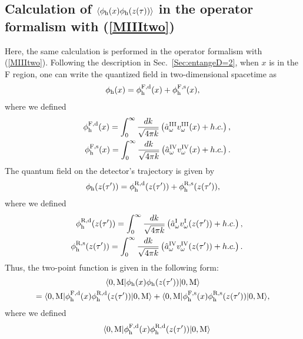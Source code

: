 \documentclass[aps,prd,preprintnumbers,nofootinbib,showpacs,11pt]{revtex4}%
\begin{document}
\begin{widetext}
\subsection{Calculation of $\langle\phi_{\rm h}(x)\phi_{\rm h}(z(\tau))\rangle$ in the operator formalism with 
(\ref{MIIItwo})}
Here, the same calculation is performed in the operator formalism with (\ref{MIIItwo}).
Following the description in Sec.~\ref{Sec:entangeD=2}, 
when $x$ is in the F region, one can write the quantized field 
in two-dimensional spacetime as 
\begin{eqnarray}
\phi_{\rm h}(x)=\phi_{\rm h}^{\rm F,d}(x)+\phi_{\rm h}^{\rm F,s}(x),
\end{eqnarray}
where we defined
\begin{eqnarray}
&&\phi_{\rm h}^{\rm F,d}(x)=\int_{0}^{\infty} {dk\over \sqrt{4\pi k}}  \left(\hat a^{\rm III}_\omega
v_\omega^{\rm III}(x) +h.c.\right),
\\
&&\phi_{\rm h}^{\rm F,s}(x)=\int_{0}^{\infty} {dk\over \sqrt{4\pi k}}  
\left(\hat a^{\rm IV}_\omega
v_\omega^{\rm IV}(x) +h.c.\right).
\end{eqnarray}
The quantum field on the detector's trajectory is given by 
\begin{eqnarray}
\phi_{\rm h}(z(\tau'))=\phi_{\rm h}^{\rm R,d}(z(\tau'))+\phi_{\rm h}^{\rm R,s}(z(\tau')),
\end{eqnarray}
where we defined
\begin{eqnarray}
&&\phi_{\rm h}^{\rm R,d}(z(\tau'))=\int_{0}^{\infty} {dk\over \sqrt{4\pi k}}  
 \left(\hat a^{\rm I}_\omega
v_\omega^{\rm I}(z(\tau')) +h.c.\right),
\\
&&\phi_{\rm h}^{\rm R,s}(z(\tau'))=\int_{0}^{\infty} {dk\over \sqrt{4\pi k}}  
 \left(\hat a^{\rm IV}_\omega
v_\omega^{\rm IV}(z(\tau')) +h.c.\right).
\end{eqnarray}
Thus, the two-point function is given in the following form:
\begin{multline}
\langle 0,{\rm M}| \phi_{\rm h}(x) \phi_{\rm h} (z(\tau'))|0, {\rm M}\rangle\\
=
\langle 0,{\rm M}| \phi_{\rm h}^{\rm F,d}(x) \phi_{\rm h}^{\rm R,d}(z(\tau'))|0, {\rm M}\rangle
+\langle 0,{\rm M}| \phi_{\rm h}^{\rm F,s}(x) \phi_{\rm h}^{\rm R,s}(z(\tau'))|0, {\rm M}\rangle,
\end{multline}
where we defined
\begin{eqnarray}
&&\langle 0,{\rm M}| \phi_{\rm h}^{\rm F,d}(x) \phi_{\rm h}^{\rm R,d}(z(\tau'))|0, {\rm M}\rangle

\end{eqnarray}
\end{widetext}
\end{document}
